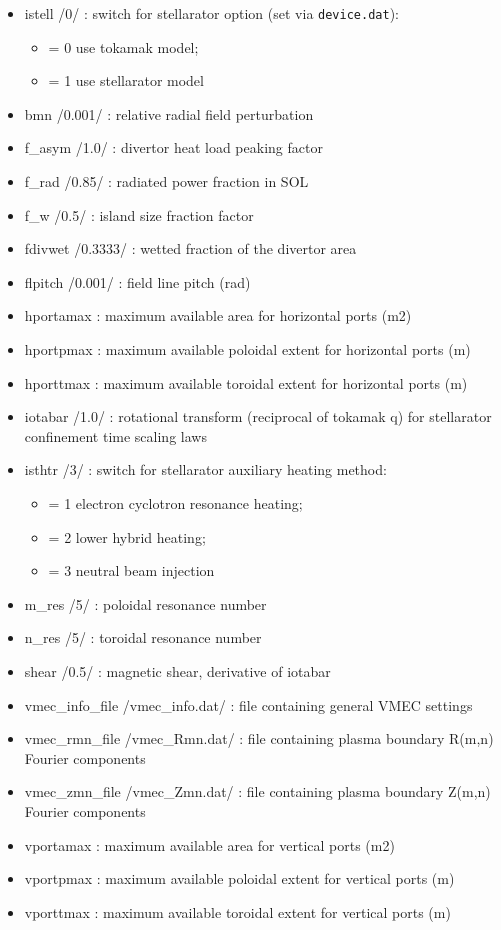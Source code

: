 \documentclass[]{article}
\providecommand{\tightlist}{%
  \setlength{\itemsep}{0pt}\setlength{\parskip}{0pt}}
\begin{document}
\begin{itemize}
\tightlist
\item
  istell /0/ : switch for stellarator option (set via
  \texttt{device.dat}):

  \begin{itemize}
  \tightlist
  \item
    = 0 use tokamak model;
  \item
    = 1 use stellarator model
  \end{itemize}
\item
  bmn /0.001/ : relative radial field perturbation
\item
  f\_asym /1.0/ : divertor heat load peaking factor
\item
  f\_rad /0.85/ : radiated power fraction in SOL
\item
  f\_w /0.5/ : island size fraction factor
\item
  fdivwet /0.3333/ : wetted fraction of the divertor area
\item
  flpitch /0.001/ : field line pitch (rad)
\item
  hportamax : maximum available area for horizontal ports (m2)
\item
  hportpmax : maximum available poloidal extent for horizontal ports (m)
\item
  hporttmax : maximum available toroidal extent for horizontal ports (m)
\item
  iotabar /1.0/ : rotational transform (reciprocal of tokamak q) for
  stellarator confinement time scaling laws
\item
  isthtr /3/ : switch for stellarator auxiliary heating method:

  \begin{itemize}
  \tightlist
  \item
    = 1 electron cyclotron resonance heating;
  \item
    = 2 lower hybrid heating;
  \item
    = 3 neutral beam injection
  \end{itemize}
\item
  m\_res /5/ : poloidal resonance number
\item
  n\_res /5/ : toroidal resonance number
\item
  shear /0.5/ : magnetic shear, derivative of iotabar
\item
  vmec\_info\_file /vmec\_info.dat/ : file containing general VMEC
  settings
\item
  vmec\_rmn\_file /vmec\_Rmn.dat/ : file containing plasma boundary
  R(m,n) Fourier components
\item
  vmec\_zmn\_file /vmec\_Zmn.dat/ : file containing plasma boundary
  Z(m,n) Fourier components
\item
  vportamax : maximum available area for vertical ports (m2)
\item
  vportpmax : maximum available poloidal extent for vertical ports (m)
\item
  vporttmax : maximum available toroidal extent for vertical ports (m)
\end{itemize}
\end{document}
